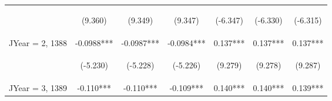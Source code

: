\documentclass[]{article}
\begin{document}
\begin{center}
\begin{tabular}{lcccccc}
        \vspace{4pt}     & \begin{footnotesize}(9.360)\end{footnotesize}  & \begin{footnotesize}(9.349)\end{footnotesize}  & \begin{footnotesize}(9.347)\end{footnotesize}  & \begin{footnotesize}(-6.347)\end{footnotesize} & \begin{footnotesize}(-6.330)\end{footnotesize} & \begin{footnotesize}(-6.315)\end{footnotesize} \\
        JYear = 2, 1388  & -0.0988***                                     & -0.0987***                                     & -0.0984***                                     & 0.137***                                       & 0.137***                                       & 0.137***                                       \\
        \vspace{4pt}     & \begin{footnotesize}(-5.230)\end{footnotesize} & \begin{footnotesize}(-5.228)\end{footnotesize} & \begin{footnotesize}(-5.226)\end{footnotesize} & \begin{footnotesize}(9.279)\end{footnotesize}  & \begin{footnotesize}(9.278)\end{footnotesize}  & \begin{footnotesize}(9.287)\end{footnotesize}  \\
        JYear = 3, 1389  & -0.110***                                      & -0.110***                                      & -0.109***                                      & 0.140***                                       & 0.140***                                       & 0.139***                                       \\

\end{tabular}
\end{center}
\end{document}
